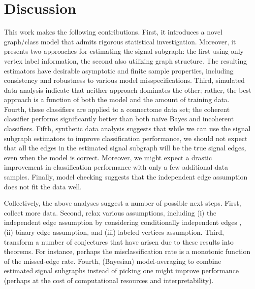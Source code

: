 \documentclass[10pt,journal,cspaper,compsoc]{IEEEtran}
\begin{document}









\section{Discussion} %
\label{sec:discussion}

This work makes the following contributions. First, it introduces a novel graph/class model that admits rigorous statistical investigation.  Moreover, it presents two approaches for estimating the signal subgraph: the first using only vertex label information, the second also utilizing graph structure.  The resulting estimators have desirable asymptotic and finite sample properties, including consistency and robustness to various model misspecifications.  Third, simulated data analysis indicate that neither approach dominates the other; rather, the best approach is a function of both the model and the amount of training data. Fourth, these classifiers are applied to a connectome data set; the coherent classifier performs significantly better than both na\"ive Bayes and incoherent classifiers.  Fifth, synthetic data analysis suggests that while we can use the signal subgraph estimators to improve classification performance, we should not expect that all the edges in the estimated signal subgraph will be the true signal edges, even when the model is correct. Moreover, we might expect a drastic improvement in classification performance with only a few additional data samples.  Finally, model checking suggests that the independent edge assumption does not fit the data well.  

Collectively, the above analyses suggest a number of possible next steps.  First, collect more data.  Second, relax various assumptions, including (i) the independent edge assumption by considering conditionally independent edges \cite{Hoff02}, (ii) binary edge assumption, and (iii) labeled vertices assumption.  Third, transform a number of conjectures that have arisen due to these results into theorems.  For instance, perhaps the misclassification rate is a monotonic function of the missed-edge rate.  Fourth, (Bayesian) model-averaging to combine estimated signal subgraphs instead of picking one might improve performance (perhaps at the cost of computational resources and interpretability).  
\end{document}

